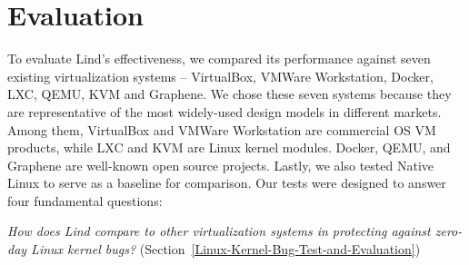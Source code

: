 \section{Evaluation}
\label{sec.evaluation}

To evaluate Lind's effectiveness, 
we compared its performance against seven existing
virtualization systems -- VirtualBox, VMWare
Workstation, Docker, LXC, QEMU, KVM and Graphene. 
We chose these seven systems because they are representative of the most
widely-used design models in different markets.
Among them, VirtualBox and VMWare Workstation are commercial OS VM products, while
LXC and KVM are Linux kernel modules. Docker, QEMU, and Graphene are well-known open
source projects. Lastly, we also tested Native Linux to serve as a
baseline for comparison.
%
Our tests were designed to answer four fundamental questions:

\textit{How does Lind compare to other virtualization systems
in protecting against zero-day Linux kernel bugs?}
(Section~{\ref{Linux-Kernel-Bug-Test-and-Evaluation}})

